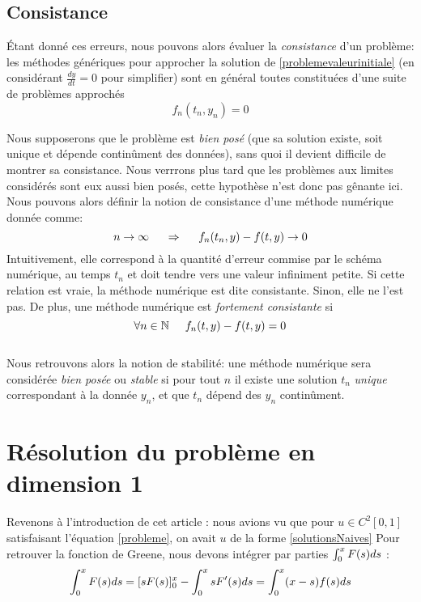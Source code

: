 \documentclass[12pt]{article}
\newcommand{\N}{\mathbb N}
\newcommand{\espace}{\hspace{5mm}}
\begin{document}
\subsection{Consistance}
\quad Étant donné ces erreurs, nous pouvons alors évaluer la \emph{consistance} d'un problème: les méthodes génériques pour approcher la solution de \eqref{problemevaleurinitiale} (en considérant $\frac{dy}{dt} = 0$ pour simplifier) sont en général toutes constituées d'une suite de problèmes approchés
\begin{equation}
f_n(t_n, y_n) = 0
\end{equation}

Nous supposerons que le problème est \emph{bien posé} (que sa solution existe, soit unique et dépende continûment des données), sans quoi il devient difficile de montrer sa consistance. Nous verrrons plus tard que les problèmes aux limites considérés sont eux aussi bien posés, cette hypothèse n'est donc pas gênante ici.\\
\quad Nous pouvons alors définir la notion de consistance d'une méthode numérique donnée comme:
\begin{equation} \label{defConsistance}
n \rightarrow \infty \espace \Rightarrow \espace f_n(t_n, y) - f(t,y) \rightarrow 0
\end{equation}
Intuitivement, elle correspond à la quantité d'erreur commise par le schéma numérique, au temps $t_n$ et doit tendre vers une valeur infiniment petite.
Si cette relation est vraie, la méthode numérique est dite consistante. Sinon, elle ne l'est pas. De plus, une méthode numérique est \emph{fortement consistante} si
\begin{equation}
\forall n \in \N \espace  f_n(t, y) - f(t,y) = 0
\end{equation}
\\
\quad Nous retrouvons alors la notion de stabilité: une méthode numérique sera considérée \emph{bien posée} ou \emph {stable} si pour tout $n$ il existe une solution $t_n$ \emph{unique} correspondant à la donnée $y_n$, et que $t_n$ dépend des $y_n$ continûment.


\section{Résolution du problème en dimension 1}

\quad Revenons à l'introduction de cet article : nous avions vu que pour $u \in C^2 [0, 1]$ satisfaisant l'équation \eqref{probleme}, on avait $u$ de la forme \eqref{solutionsNaives}  Pour retrouver la fonction de Greene, nous devons intégrer par parties $\int_0^x F\relax(s) ds$ : 
\begin{equation}
\int_0^x F\relax(s) ds = [sF\relax(s)]_0^x - \int_0^x sF'\relax(s) ds = \int_0^x(x-s)f\relax(s)ds
\end{equation}
\end{document}
